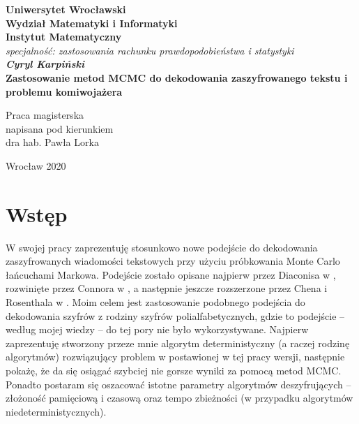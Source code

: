 \documentclass[a4paper]{article}
\theoremstyle{defn}
\theoremstyle{theorem}
\theoremstyle{lemma}
\theoremstyle{cor}
\theoremstyle{fact}
\begin{document}
\lstset{language=Python}

\newpage
\thispagestyle{empty}
\begin{center}
\textbf{\large Uniwersytet Wrocławski\\
Wydział Matematyki i Informatyki\\
Instytut Matematyczny}\\
\textit{\large specjalność: zastosowania rachunku prawdopodobieństwa i statystyki}\\
\vspace{4cm}
\textbf{\textit{\large Cyryl Karpiński}\\
\vspace{0.5cm}
{\Large Zastosowanie metod MCMC do dekodowania zaszyfrowanego tekstu
i problemu komiwojażera}}\\
\end{center}
\vspace{3cm}
{\large \hspace*{6.5cm}Praca magisterska\\
\hspace*{6.5cm}napisana pod kierunkiem\\
\hspace*{6.5cm}dra hab. Pawła Lorka}\\
\vfill
\begin{center}
{\large Wrocław 2020}\\
\end{center}

\newpage
\tableofcontents
\newpage
\section{Wstęp}
W swojej pracy zaprezentuję stosunkowo nowe podejście do dekodowania zaszyfrowanych wiadomości tekstowych przy użyciu próbkowania Monte Carlo łańcuchami Markowa. Podejście zostało opisane najpierw przez Diaconisa w \cite{Diaconis}, rozwinięte przez Connora w \cite{Connor}, a następnie jeszcze rozszerzone przez Chena i Rosenthala w \cite{Chen&Rosenthal}. Moim celem jest zastosowanie podobnego podejścia do dekodowania szyfrów z rodziny szyfrów polialfabetycznych, gdzie to podejście – według mojej wiedzy – do tej pory nie było wykorzystywane. Najpierw zaprezentuję stworzony przeze mnie algorytm deterministyczny (a raczej rodzinę algorytmów) rozwiązujący problem w postawionej w tej pracy wersji, następnie pokażę, że da się osiągać szybciej nie gorsze wyniki za pomocą metod MCMC. Ponadto postaram się oszacować istotne parametry algorytmów deszyfrujących – złożoność pamięciową i czasową oraz tempo zbieżności (w przypadku algorytmów niedeterministycznych).
\end{document}
